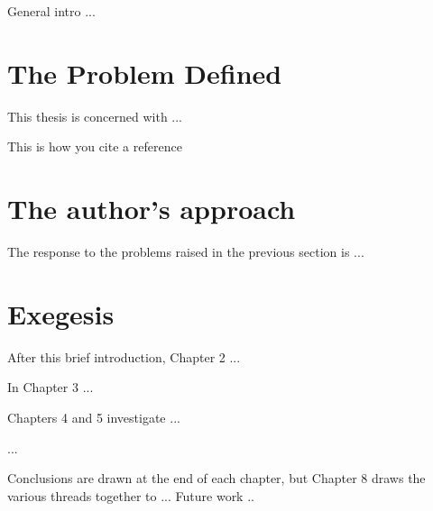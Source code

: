 
General intro ...

\section{The Problem Defined}
\label{sec:intro:problem}

This thesis is concerned with ...

This is how you cite a reference \cite{citeulike:1448130}

\section{The author's approach}
\label{sec:intro:approach}

The response to the problems raised in the previous section is ...


\section{Exegesis}
\label{sec:intro:exegesis}

After this brief introduction, Chapter 2 ...

In Chapter 3 ...

Chapters 4 and 5 investigate ...

...

Conclusions are drawn at the end of each chapter,
but Chapter 8 draws the various threads together to ...
Future work ..


